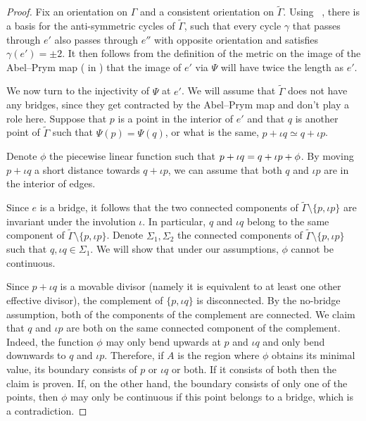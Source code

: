 \documentclass[11pt]{article}
\theoremstyle{definition}
\numberwithin{equation}{section}
\theoremstyle{definition}
\newcommand{\wt}[1]{\widetilde{#1}}
\let\ddiv\relax
\DeclareMathOperator{\ddiv}{div}
\begin{document}
\begin{proof}

    Fix an orientation on $\Gamma$
 and a  consistent orientation on $\wt\Gamma$.    Using ~\cite[Construction B]{LZ22}, there is a basis for the anti-symmetric cycles of $\wt\Gamma$, such that every cycle $\gamma$ that passes through $e'$ also passes through $e''$ with opposite orientation and satisfies $\gamma(e') = \pm 2$. It then follows from the definition of the metric on the image of the Abel--Prym map  ( in ) that the image of $e'$ via $\Psi$ will have twice the length as $e'$. 
    

We now turn to the  injectivity of $\Psi$ at $e'$. We will assume that $\wt\Gamma$ does not have any bridges, since they get contracted by the Abel--Prym map and don't play a role here. Suppose that $p$ is a point in the interior of $e'$ and that $q$ is another point of $\wt\Gamma$ such that  $\Psi(p) = \Psi(q)$, or what is the same,  $p+\iota q\simeq q+\iota p$. 

Denote $\phi$ the piecewise linear function such that $p+\iota q = q + \iota p + \ddiv\phi$. By moving $p+\iota q$ a short distance towards $q+\iota p$, we can assume that both $q$ and $\iota p$ are in the interior of edges. 


Since   $e$ is a bridge, it follows that the two connected components of $\wt\Gamma\setminus\{p,\iota p\}$ are invariant under the involution $\iota$. In particular, $q$ and $\iota q$ belong to the same component of $\wt\Gamma\setminus\{p,\iota p\}$.
Denote $\Sigma_1,\Sigma_2$ the connected components of $\wt\Gamma\setminus\{p,\iota p\}$ such that $q,\iota q\in\Sigma_1$. We will show that under our assumptions, $\phi$ cannot be continuous. 



 
Since $p + \iota q$  is a movable divisor (namely it is equivalent to at least one other effective divisor), the complement of $\{p,\iota q\}$  is disconnected. By the no-bridge assumption, both of the components of the complement are connected. 
We claim that $q$ and $\iota p$ are both on the same  connected component of the complement. 
Indeed, the function $\phi$ may only bend upwards at $p$ and $\iota q$ and only bend downwards to $q$ and $\iota p$. Therefore, if $A$ is the region where $\phi$  obtains its minimal value, its boundary consists of $p$ or $\iota q$ or both. If it consists of both then the claim is proven. 
If, on the other hand, the boundary consists of only one of the points, then $\phi$ may only be continuous if this point belongs to a bridge, which is a contradiction. 


\end{proof}
\end{document}
